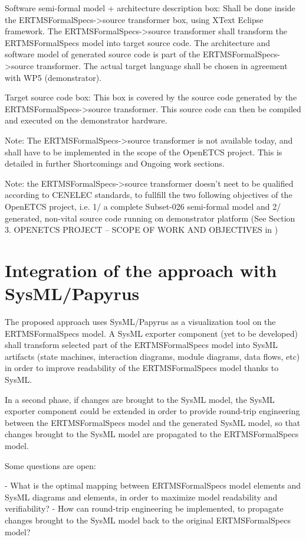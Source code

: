 Software semi-formal model + architecture description box: Shall be done inside the ERTMSFormalSpecs->source transformer box, using XText Eclipse framework.
The ERTMSFormalSpecs->source transformer shall transform the ERTMSFormalSpecs model into target source code. The architecture and software model of generated source code is part of the ERTMSFormalSpecs->source transformer. The actual target language shall be chosen in agreement with WP5 (demonstrator).

Target source code box: This box is covered by the source code generated by the ERTMSFormalSpecs->source transformer. This source code can then be compiled and executed on the demonstrator hardware.

Note: The ERTMSFormalSpecs->source transformer is not available today, and shall have to be implemented in the scope of the OpenETCS project. This is detailed in further Shortcomings and Ongoing work sections.

Note: the ERTMSFormalSpecs->source transformer doesn't neet to be qualified according to CENELEC standards, to fullfill the two following objectives of the OpenETCS project, i.e. 1/ a complete Subset-026 semi-formal model and 2/ generated, non-vital source code running on demonstrator platform (See Section 3. OPENETCS PROJECT – SCOPE OF WORK AND OBJECTIVES in \citep{WP3_WP4_WP7_SafetyMeetingMinutes_April2013})

\section{Integration of the approach with SysML/Papyrus}

The proposed approach uses SysML/Papyrus as a visualization tool on the ERTMSFormalSpecs model. A SysML exporter component (yet to be developed) shall transform selected part of the ERTMSFormalSpecs model into SysML artifacts (state machines, interaction diagrams, module diagrams, data flows, etc) in order to improve readability of the ERTMSFormalSpecs model thanks to SysML. 

In a second phase, if changes are brought to the SysML model, the SysML exporter component could be extended in order to provide round-trip engineering between the ERTMSFormalSpecs model and the generated SysML model, so that changes brought to the SysML model are propagated to the ERTMSFormalSpecs model.

Some questions are open:

- What is the optimal mapping between ERTMSFormalSpecs model elements and SysML diagrams and elements, in order to maximize model readability and verifiability? 
- How can round-trip engineering be implemented, to propagate changes brought to the SysML model back to the original ERTMSFormalSpecs model?

